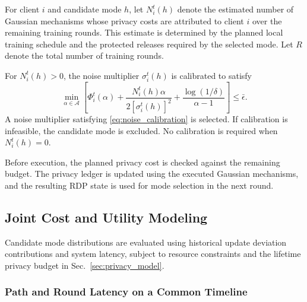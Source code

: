 \documentclass[5p,times]{elsarticle}
\theoremstyle{plain}
\theoremstyle{definition}
\theoremstyle{remark}
\begin{document}
	For client \(i\) and candidate mode \(h\), let
	\(N_i^t(h)\) denote the estimated number of Gaussian
	mechanisms whose privacy costs are attributed to
	client \(i\) over the remaining training rounds.
	This estimate is determined by the planned local
	training schedule and the protected releases
	required by the selected mode. Let \(R\) denote
	the total number of training rounds.
	
	For \(N_i^t(h)>0\), the noise multiplier
	\(\sigma_i^t(h)\) is calibrated to satisfy
	\begin{equation}
		\min_{\alpha\in\mathcal A}
		\left[
		\Phi_i^t(\alpha)
		+
		\frac{N_i^t(h)\alpha}
		{2[\sigma_i^t(h)]^2}
		+
		\frac{\log(1/\delta)}{\alpha-1}
		\right]
		\leq\bar{\epsilon}.
		\label{eq:noise_calibration}
	\end{equation}
	A noise multiplier satisfying
	\eqref{eq:noise_calibration} is selected.
	If calibration is infeasible, the candidate
	mode is excluded. No calibration is required
	when \(N_i^t(h)=0\).
	
	Before execution, the planned privacy cost
	is checked against the remaining budget.
	The privacy ledger is updated using the
	executed Gaussian mechanisms, and the resulting
	RDP state is used for mode selection in
	the next round.
	
	\subsection{Joint Cost and Utility Modeling}
	\label{sec:cost_utility_model}
	Candidate mode distributions are evaluated using historical update
	deviation contributions and system latency, subject to resource
	constraints and the lifetime privacy budget in
	Sec.~\ref{sec:privacy_model}.
	\subsubsection{Path and Round Latency on a Common Timeline}
	
\end{document}
